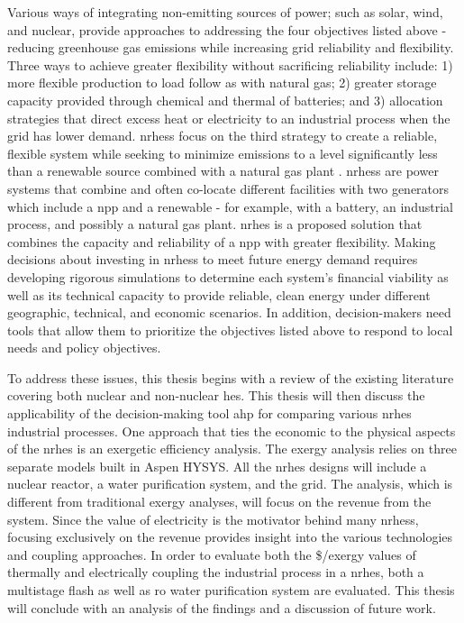 Various ways of integrating non-emitting sources of power; such as solar, wind, and nuclear, provide approaches to addressing the four objectives listed above - reducing greenhouse gas emissions while increasing grid reliability and flexibility. Three ways to achieve greater flexibility without sacrificing reliability include: 1) more flexible production to load follow as with natural gas; 2) greater storage capacity provided through chemical and thermal of batteries; and 3)  allocation strategies that direct excess heat or electricity to an industrial process when the grid has lower demand. \ac{nrhess} focus on the third strategy to create a reliable, flexible system while seeking to minimize emissions to a level significantly less than a renewable source combined with a natural gas plant \cite{Baker2016}. \ac{nrhess} are power systems that combine and often co-locate different facilities with two generators which include a \ac{npp} and a renewable - for example, with a battery, an industrial process, and possibly a natural gas plant.  \ac{nrhes} is a proposed solution that combines the capacity and reliability of a \ac{npp} with greater flexibility.
Making decisions about investing in \ac{nrhess} to meet future energy demand requires developing rigorous simulations to determine each system's financial viability as well as its technical capacity to provide reliable, clean energy under different geographic, technical, and economic scenarios. In addition, decision-makers need tools that allow them to prioritize the objectives listed above to respond to local needs and policy objectives.


To address these issues, this thesis begins with a review of the existing literature covering both nuclear and non-nuclear \ac{hes}.  This thesis will then discuss the applicability of the decision-making tool \ac{ahp} for comparing various \ac{nrhes} industrial processes. One approach that ties the economic to the physical aspects of the \ac{nrhes} is an exergetic efficiency analysis. The exergy analysis relies on three separate models built in Aspen HYSYS. All the \ac{nrhes} designs will include a nuclear reactor, a water purification system, and the grid. The analysis, which is different from traditional exergy analyses, will focus on the revenue from the system.  Since the value of electricity is the motivator behind many \ac{nrhess}, focusing exclusively on the revenue provides insight into the various technologies and coupling approaches. In order to evaluate both the \$/exergy values of thermally and electrically coupling the industrial process in a \ac{nrhes}, both a multistage flash as well as \ac{ro} water purification system are evaluated.  This thesis will conclude with an analysis of the findings and a discussion of future work.
